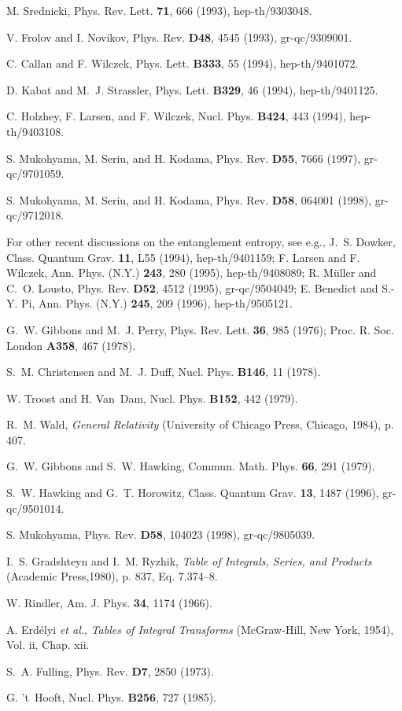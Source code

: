 \begin{thebibliography}{10}
M. Srednicki, Phys. Rev. Lett. {\bf 71},  666  (1993), hep-th/9303048.

V. Frolov and I. Novikov, Phys. Rev. {\bf D48},  4545  (1993), gr-qc/9309001.

C. Callan and F. Wilczek, Phys. Lett. {\bf B333},  55  (1994), hep-th/9401072.

D. Kabat and M.~J. Strassler, Phys. Lett. {\bf B329},  46  (1994),
  hep-th/9401125.

C. Holzhey, F. Larsen, and F. Wilczek, Nucl. Phys. {\bf B424},  443  (1994),
  hep-th/9403108.

S. Mukohyama, M. Seriu, and H. Kodama, Phys. Rev. {\bf D55},  7666  (1997),
  gr-qc/9701059.

S. Mukohyama, M. Seriu, and H. Kodama, Phys. Rev. {\bf D58},  064001  (1998),
  gr-qc/9712018.

For other recent discussions on the entanglement entropy,
see e.g.,
J.~S. Dowker, Class. Quantum Grav. {\bf 11},  L55  (1994), hep-th/9401159;
F. Larsen and F. Wilczek, Ann. Phys. (N.Y.) {\bf 243},  280  (1995),
  hep-th/9408089;
R. M{\"u}ller and C.~O. Lousto, Phys. Rev. {\bf D52},  4512  (1995),
  gr-qc/9504049;
E. Benedict and S.-Y. Pi, Ann. Phys. (N.Y.) {\bf 245},  209  (1996),
  hep-th/9505121.

G.~W. Gibbons and M.~J. Perry, Phys. Rev. Lett. {\bf 36},  985  (1976);
Proc. R. Soc. London {\bf A358},  467  (1978).

S.~M. Christensen and M.~J. Duff, Nucl. Phys. {\bf B146},  11  (1978).

W. Troost and H. Van~Dam, Nucl. Phys. {\bf B152},  442  (1979).

R.~M. Wald, {\em General Relativity} (University of Chicago Press, Chicago,
  1984), p. 407.

G.~W. Gibbons and S.~W. Hawking, Commun. Math. Phys. {\bf 66},  291  (1979).

S.~W. Hawking and G.~T. Horowitz, Class. Quantum Grav. {\bf 13},  1487  (1996),
  gr-qc/9501014.

S. Mukohyama, Phys. Rev. {\bf D58},  104023  (1998), gr-qc/9805039.

I.~S. Gradshteyn and I.~M. Ryzhik, {\em Table of Integrals, Series,
  and Products} (Academic Press,1980), p. 837, Eq. 7.374--8.

W. Rindler, Am. J. Phys. {\bf 34},  1174  (1966).

A. Erd\'elyi {\em et al.}, {\em Tables of Integral Transforms}
(McGraw-Hill, New York, 1954),
Vol. \Rn{2}, Chap. \Rn{12}.

S.~A. Fulling, Phys. Rev. {\bf D7},  2850  (1973).

G. 't~Hooft, Nucl. Phys. {\bf B256},  727  (1985).

\end{thebibliography}


